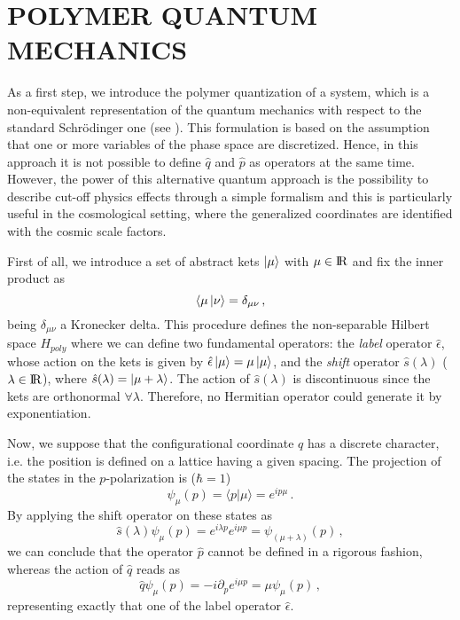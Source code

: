 \documentclass[aps,prd,twocolumn,nofootinbib,superscriptaddress]{revtex4-2}
\begin{document}
\section{POLYMER QUANTUM MECHANICS\label{pol}}
As a first step, we introduce the polymer quantization of a system, which is a non-equivalent representation of the quantum mechanics with respect to the standard Schr\"{o}dinger one (see \cite{Pol}). This formulation is based on the assumption that one or more variables of the phase space are discretized. Hence, in this approach it is not possible to define $\hat q$ and $\hat p$ as operators at the same time. However, the power of this alternative quantum approach is the possibility to describe cut-off physics effects through a simple formalism and this is particularly useful in the cosmological setting, where the generalized coordinates are identified with the cosmic scale factors.

First of all, we introduce a set of abstract kets $\ket \mu$ with $\mu \in {\rm I\!R}$ and fix the inner product as	
\begin{equation}
\langle \mu \ket {\nu} =\delta_{\mu\nu}\,,
\end{equation}
being $\delta_{\mu\nu}$ a Kronecker delta. This procedure defines the non-separable Hilbert space $H_{poly}$ where we can define two fundamental operators: the \emph{label} operator $\hat\epsilon$, whose action on the kets is given by $\hat\epsilon\ket\mu=\mu\ket\mu$, and the \emph{shift} operator $\hat s(\lambda)$ ($\lambda\in {\rm I\!R}$), where $\hat s (\lambda)=\ket{\mu+\lambda}$. The action of $\hat s (\lambda)$ is discontinuous since the kets are orthonormal $\forall \lambda$. Therefore, no Hermitian operator could generate it by exponentiation.

Now, we suppose that the configurational coordinate $q$ has a discrete character, i.e. the position is defined on a lattice having a given spacing. The projection of the states in the $p$-polarization is ($\hbar=1$)
\begin{equation}
    \psi_{\mu}(p)=\langle p|\mu\rangle=e^{ip\mu}\,.
\end{equation}
By applying the shift operator on these states as
\begin{equation}
	\hat s(\lambda)\psi_{\mu}(p)=e^{i\lambda p}e^{i\mu p}=\psi_{(\mu+\lambda)}(p)\,,
\end{equation}
we can conclude that the operator $\hat p$ cannot be defined in a rigorous fashion, whereas the action of $\hat q$ reads as
\begin{equation}
	\hat q \psi_{\mu}(p)=-i\partial_{p}e^{i\mu p}=\mu\psi_{\mu}(p)\,,
\end{equation}
representing exactly that one of the label operator $\hat\epsilon$.
\end{document}
